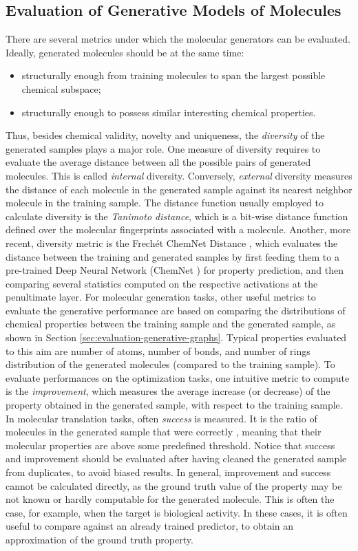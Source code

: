 \subsection{Evaluation of Generative Models of Molecules}
There are several metrics under which the molecular generators can be evaluated. Ideally, generated molecules should be at the same time:
\begin{itemize}
    \item structurally  enough from training molecules to span the largest possible chemical subspace;
    \item structurally  enough to possess similar interesting chemical properties.
\end{itemize}
Thus, besides chemical validity, novelty and uniqueness, the \emph{diversity} of the generated samples plays a major role. One measure of diversity requires to evaluate the average distance between all the possible pairs of generated molecules. This is called \emph{internal} diversity. Conversely, \emph{external} diversity measures the distance of each molecule in the generated sample against its nearest neighbor molecule in the training sample. The distance function usually employed to calculate diversity is the \emph{Tanimoto distance}, which is a bit-wise distance function defined over the molecular fingerprints associated with a molecule. Another, more recent, diversity metric is the Frechét ChemNet Distance \cite{preuer2018frechetdistance}, which evaluates the distance between the training and generated samples by first feeding them to a pre-trained Deep Neural Network (ChemNet \cite{goh2017chemnet}) for property prediction, and then comparing several statistics computed on the respective activations at the penultimate layer.
For molecular generation tasks, other useful metrics to evaluate the generative performance are based on comparing the distributions of chemical properties between the training sample and the generated sample, as shown in Section \ref{sec:evaluation-generative-graphs}. Typical properties evaluated to this aim are number of atoms, number of bonds, and number of rings distribution of the generated molecules (compared to the training sample). To evaluate performances on the optimization tasks, one intuitive metric to compute is the \emph{improvement}, which measures the average increase (or decrease) of the property obtained in the generated sample, with respect to the training sample. In molecular translation tasks, often \emph{success} is measured. It is the ratio of molecules in the generated sample that were correctly , meaning that their molecular properties are above some predefined threshold. Notice that success and improvement should be evaluated after having cleaned the generated sample from duplicates, to avoid biased results. In general, improvement and success cannot be calculated directly, as the ground truth value of the property may be not known or hardly computable for the generated molecule. This is often the case, for example, when the target is biological activity. In these cases, it is often useful to compare against an already trained predictor, to obtain an approximation of the ground truth property.


